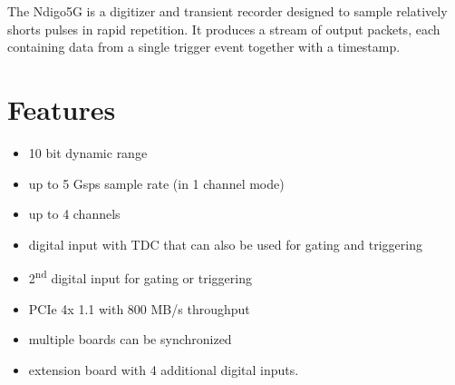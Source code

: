 The Ndigo5G is a digitizer and transient recorder designed to sample relatively shorts pulses in rapid repetition. It produces a stream of output packets, each containing data from a single trigger event together with a timestamp.
\section{Features}
	\begin{itemize}
		\item 10 bit dynamic range
		\item up to 5 Gsps sample rate (in 1 channel mode)
		\item up to 4 channels
		\item digital input with TDC that can also be used for gating and triggering
		\item 2\textsuperscript{nd} digital input for gating or triggering
		\item PCIe 4x 1.1 with 800 MB/s throughput
		\item multiple boards can be synchronized
		\item extension board with 4 additional digital inputs.
	\end{itemize}
